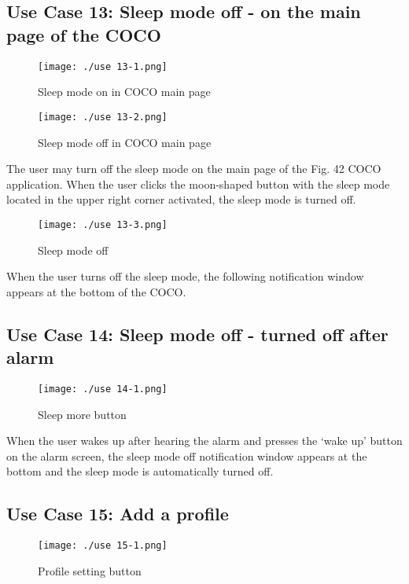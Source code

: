 \documentclass[conference]{IEEEtran}
\begin{document}
\subsection{Use Case 13: Sleep mode off - on the main page of the COCO}

\begin{figure}[H]
\texttt{[image: ./use 13-1.png]}
\centering
\caption{Sleep mode on in COCO main page}
\end{figure}

\begin{figure}[H]
\texttt{[image: ./use 13-2.png]}
\centering
\caption{Sleep mode off in COCO main page}
\end{figure}

The user may turn off the sleep mode on the main page of the Fig. 42 COCO application. When the user clicks the moon-shaped button with the sleep mode located in the upper right corner activated, the sleep mode is turned off.

\begin{figure}[H]
\texttt{[image: ./use 13-3.png]}
\centering
\caption{Sleep mode off}
\end{figure}

When the user turns off the sleep mode, the following notification window appears at the bottom of the COCO.

\subsection{Use Case 14: Sleep mode off - turned off after alarm}

\begin{figure}[H]
\texttt{[image: ./use 14-1.png]}
\centering
\caption{Sleep more button}
\end{figure}

When the user wakes up after hearing the alarm and presses the ‘wake up' button on the alarm screen, the sleep mode off notification window appears at the bottom and the sleep mode is automatically turned off.

\subsection{Use Case 15: Add a profile}

\begin{figure}[H]
\texttt{[image: ./use 15-1.png]}
\centering
\caption{Profile setting button}
\end{figure}
\end{document}
